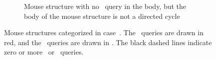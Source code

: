{\begin{figure}
\begin{subfigure}[t]{0.42\columnwidth}
\begin{tikzpicture}[scale=3]
        \end{tikzpicture}
    \caption{Mouse structure with no \new\ query in the body, but the body of the mouse structure is not a directed cycle}\label{fig:nonewsixnotip}        
\end{subfigure}


\caption{Mouse structures categorized in case~. The \new\ queries are drawn in {\color{red} red}, and the \urep\ queries are drawn in {\color{\repnmcolor}\repnmcolor}. The black dashed lines indicate zero or more \new\ or \urep\ queries.}\label{fig:unfam}
\end{figure}
}
